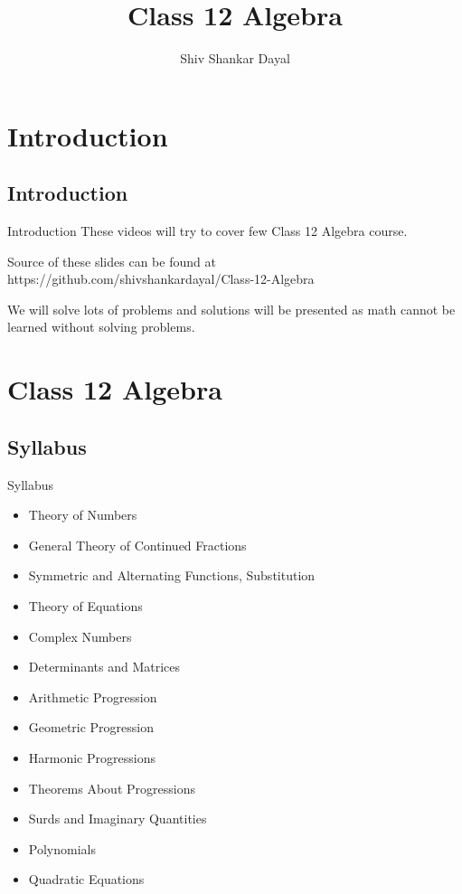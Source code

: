 \documentclass[aspectratio=1610,8pt]{beamer}
\title{Class 12 Algebra}
\author[Shiv Shankar Dayal]
       {
	       Shiv Shankar Dayal
       }
\begin{document}
\begin{frame}
       \titlepage
\end{frame}

\section{Introduction}
\subsection{Introduction}

\begin{frame}{Introduction}
	These videos will try to cover few Class 12 Algebra course.

	Source of these slides can be found at
	https://github.com/shivshankardayal/Class-12-Algebra

	We will solve lots of problems and solutions will be
	presented as math cannot be learned without solving
	problems.
\end{frame}

\section{Class 12 Algebra}
\subsection{Syllabus}
\begin{frame}{Syllabus}
	\begin{itemize}
		\item Theory of Numbers
		\item General Theory of Continued Fractions
		\item Symmetric and Alternating Functions, Substitution
		\item Theory of Equations
		\item Complex Numbers
		\item Determinants and Matrices
		\item Arithmetic Progression
		\item Geometric Progression
		\item Harmonic Progressions
		\item Theorems About Progressions
		\item Surds and Imaginary Quantities
		\item Polynomials
		\item Quadratic Equations
	\end{itemize}
\end{frame}
\end{document}
